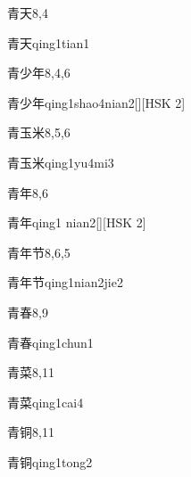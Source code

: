 \begin{entry}{青天}{8,4}
  \begin{phonetics}{青天}{qing1tian1}
  \end{phonetics}
\end{entry}

\begin{entry}{青少年}{8,4,6}
  \begin{phonetics}{青少年}{qing1shao4nian2}[][HSK 2]
  \end{phonetics}
\end{entry}

\begin{entry}{青玉米}{8,5,6}
  \begin{phonetics}{青玉米}{qing1yu4mi3}
  \end{phonetics}
\end{entry}

\begin{entry}{青年}{8,6}
  \begin{phonetics}{青年}{qing1 nian2}[][HSK 2]
  \end{phonetics}
\end{entry}

\begin{entry}{青年节}{8,6,5}
  \begin{phonetics}{青年节}{qing1nian2jie2}
  \end{phonetics}
\end{entry}

\begin{entry}{青春}{8,9}
  \begin{phonetics}{青春}{qing1chun1}
  \end{phonetics}
\end{entry}

\begin{entry}{青菜}{8,11}
  \begin{phonetics}{青菜}{qing1cai4}
  \end{phonetics}
\end{entry}

\begin{entry}{青铜}{8,11}
  \begin{phonetics}{青铜}{qing1tong2}
  \end{phonetics}
\end{entry}

